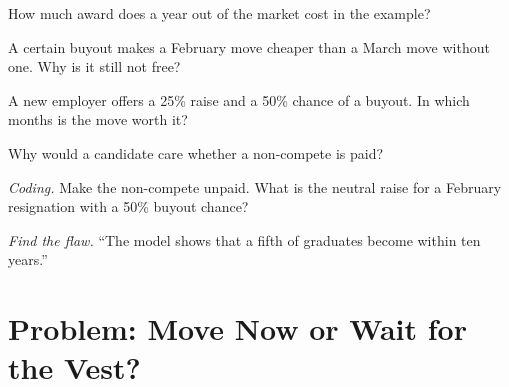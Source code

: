 \begin{exercise}[$\star$]\label{exo:in:career-paths-and-moves:3}
How much award does a year out of the market cost in the example?
\end{exercise}

\begin{exercise}[$\star\star$]\label{exo:in:career-paths-and-moves:4}
A certain buyout makes a February move cheaper than a March move without one. Why is it still not free?
\end{exercise}

\begin{exercise}[$\star\star$]\label{exo:in:career-paths-and-moves:5}
A new employer offers a 25\% raise and a 50\% chance of a buyout. In which months is the move worth it?
\end{exercise}

\begin{exercise}[$\star\star$]\label{exo:in:career-paths-and-moves:6}
Why would a candidate care whether a non-compete is paid?
\end{exercise}

\begin{exercise}[$\star\star\star$]\label{exo:in:career-paths-and-moves:7}
\emph{Coding.} Make the non-compete unpaid. What is the neutral raise for a February resignation with a 50\% buyout
chance?
\end{exercise}

\begin{exercise}[$\star\star\star$]\label{exo:in:career-paths-and-moves:8}
\emph{Find the flaw.} ``The model shows that a fifth of graduates become  within ten years.''
\end{exercise}

\section{Problem: Move Now or Wait for the Vest?}

